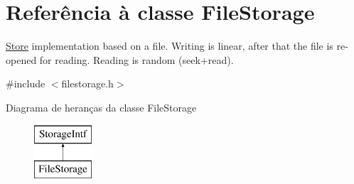 \hypertarget{class_file_storage}{\section{Referência à classe File\-Storage}
\label{class_file_storage}
}


\hyperlink{class_store}{Store} implementation based on a file. Writing is linear, after that the file is re-\/opened for reading. Reading is random (seek+read).  




{\ttfamily \#include $<$filestorage.\-h$>$}

Diagrama de heranças da classe File\-Storage\begin{figure}[H]
\begin{center}
\leavevmode
\includegraphics[height=2.000000cm]{class_file_storage}
\end{center}
\end{figure}
